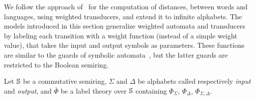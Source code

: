 We follow the approach of~\cite{Mohri03EDWA} for the computation of distances,
between words and languages, using weighted transducers,
and extend it to infinite alphabets.
%
The models introduced in this section generalize
weighted automata and transducers~\cite{Droste09handbook}
by labeling each transition with a weight function (instead of a simple weight value),
that takes the input and output symbols as parameters.
These functions are similar to the guards of symbolic automata~\cite{dAntoniVeanes17CAV,dAntoni21CACM},
but the latter guards are restricted to the Boolean semiring.
%

\noindent
Let $\mathbb{S}$ be a commutative semiring,
$\Sigma$ and $\Delta$ be alphabets called respectively \emph{input} and \emph{output}, %
and $\bar\Phi$ be a label theory over $\mathbb{S}$
containing $\Phi_\Sigma$, $\Phi_\Delta$, $\Phi_{\Sigma, \Delta}$.

